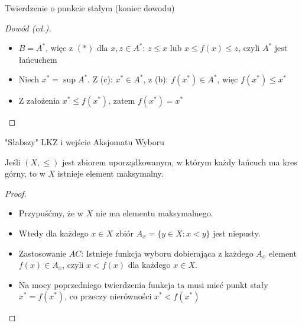 \documentclass[aspectratio=169,11pt,t,envcountsect,professionalfonts]{beamer}
\begin{document}
\begin{frame}{Twierdzenie o punkcie stałym (koniec dowodu)}
\begin{proof}[Dowód (cd.)]
    \begin{itemize}
        \item $B = A^*$, więc z $(\ast)$ dla $x, z \in A^*$: $z \leqslant x$ lub $x \leqslant f(x) \leqslant z$, czyli $A^*$ jest łańcuchem
        \item Niech $x^* = \sup A^*$. Z (c): $x^* \in A^*$, z (b): $f(x^*) \in A^*$, więc $f(x^*) \leqslant x^*$
        \item Z założenia $x^* \leqslant f(x^*)$, zatem $f(x^*) = x^*$ \qedhere
    \end{itemize}
\end{proof}
\end{frame}

\begin{frame}{"Słabszy" LKZ i wejście Aksjomatu Wyboru}
    \begin{mythm}
        Jeśli $(X, \leqslant)$ jest zbiorem uporządkowanym, w którym każdy łańcuch ma kres górny, to w $X$ istnieje element maksymalny.
    \end{mythm}
    \begin{proof}
        \begin{itemize}
            \item Przypuśćmy, że w $X$ nie ma elementu maksymalnego.
            \item Wtedy dla każdego $x \in X$ zbiór $A_x = \{y \in X : x < y\}$ jest niepusty.
            \item Zastosowanie $AC$: Istnieje funkcja wyboru dobierająca z każdego $A_x$ element $f(x) \in A_x$, czyli $x < f(x)$ dla każdego $x \in X$.
            \item Na mocy poprzedniego twierdzenia funkcja ta musi mieć punkt stały $x^* = f(x^*)$, co przeczy nierówności $x^* < f(x^*)$
        \end{itemize}
    \end{proof}
\end{frame}
\end{document}
